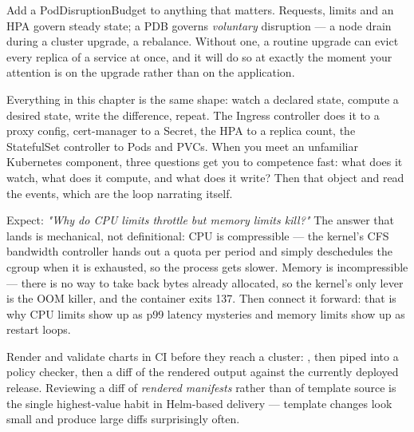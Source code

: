 \begin{reliability}
Add a PodDisruptionBudget to anything that matters. Requests, limits and an HPA govern steady state; a PDB governs \emph{voluntary} disruption --- a node drain during a cluster upgrade, a rebalance. Without one, a routine upgrade can evict every replica of a service at once, and it will do so at exactly the moment your attention is on the upgrade rather than on the application.
\end{reliability}

\begin{seniornote}
Everything in this chapter is the same shape: watch a declared state, compute a desired state, write the difference, repeat. The Ingress controller does it to a proxy config, cert-manager to a Secret, the HPA to a replica count, the StatefulSet controller to Pods and PVCs. When you meet an unfamiliar Kubernetes component, three questions get you to competence fast: what does it watch, what does it compute, and what does it write? Then  that object and read the events, which are the loop narrating itself.
\end{seniornote}

\begin{interview}
Expect: \emph{"Why do CPU limits throttle but memory limits kill?"} The answer that lands is mechanical, not definitional: CPU is compressible --- the kernel's CFS bandwidth controller hands out a quota per period and simply deschedules the cgroup when it is exhausted, so the process gets slower. Memory is incompressible --- there is no way to take back bytes already allocated, so the kernel's only lever is the OOM killer, and the container exits 137. Then connect it forward: that is why CPU limits show up as p99 latency mysteries and memory limits show up as restart loops.
\end{interview}

\begin{autotip}
Render and validate charts in CI before they reach a cluster: , then  piped into a policy checker, then a diff of the rendered output against the currently deployed release. Reviewing a diff of \emph{rendered manifests} rather than of template source is the single highest-value habit in Helm-based delivery --- template changes look small and produce large diffs surprisingly often.
\end{autotip}


